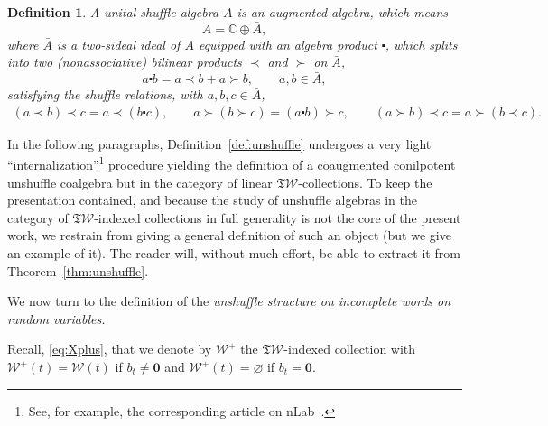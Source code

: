 \documentclass[pdftex]{sigma}
\newcommand{\SWc}{{\mathfrak{T}\mathcal{W}}}
\newcommand\IWc{\mathcal{W}}
\def\CC{\mathbb{C}}
\numberwithin{equation}{section}
\newtheorem{Definition}[Theorem]{Definition}
\begin{document}
\begin{Definition}A {\it unital shuffle algebra} $A$ is an augmented algebra, which means \[{A} = \CC\oplus \bar{A},\]
	where $\bar{A}$ is a two-sideal ideal of $A$ equipped with an algebra product
	$\centerdot$, which splits into two (nonassociative) bilinear products $\prec$ and $\succ$ on $\bar{A}$,
	\begin{equation*}
		a \centerdot b = a \prec b + a \succ b,\qquad a,b \in \bar{A},
	\end{equation*}
	satisfying the {\it shuffle relations}, with $a,b,c \in \bar{A}$,
	\begin{align*}
		 (a \prec b) \prec c = a \prec (b\centerdot c),\qquad
		a \succ (b \succ c) = (a \centerdot b) \succ c , \qquad
		 (a \succ b) \prec c = a \succ ( b \prec c).
	\end{align*}
\end{Definition}

In the following paragraphs, Definition~\ref{def:unshuffle} undergoes a very light ``internalization''\footnote{See, for example, the corresponding article on nLab~\cite{nlab:internalization}.} procedure yielding the definition of a coaugmented conilpotent unshuffle coalgebra but in the category of linear $\SWc$-collections. To keep the presentation contained, and because the study of unshuffle algebras in the category of $\SWc$-indexed collections in full generality is not the core of the present work, we restrain from giving a general definition of such an object (but we give an example of it). The reader will, without much effort, be able to extract it from Theorem~\ref{thm:unshuffle}.

We now turn to the definition of the \emph{unshuffle structure on incomplete words on random variables.}

Recall, \eqref{eq:Xplus},
that we denote by ${\IWc^+}$ the $\SWc$-indexed collection with ${\IWc^+}(t)={\IWc(t)}$ if $b_t \neq \mathbf{0}$ and $\IWc^+(t) = \varnothing$ if $b_t = \mathbf{0}$.
\end{document}

